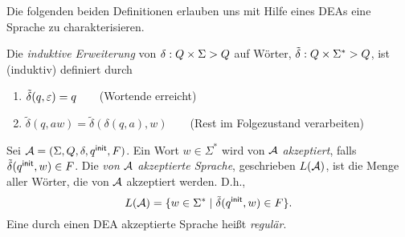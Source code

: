 \begin{center}
\end{center}

Die folgenden beiden Definitionen erlauben uns mit Hilfe eines DEAs eine Sprache zu charakterisieren.
\begin{Def}[name={[Induktive erweiterung von $\delta$ auf Wörter]}]\label{def:2.deltaschlange}
        Die \emph{induktive Erweiterung} von $\delta:Q\times\Sigma\->Q$ auf Wörter, $\tilde{\delta}: Q\times\Sigma^*\->Q$, ist (induktiv) definiert durch
  \begin{enumerate}
  \item $\tilde\delta(q,\varepsilon) =q$\ \ \ \  (Wortende erreicht)
  \item $\tilde\delta(q,aw)=\tilde\delta(\delta(q,a),w)$\ \ \ \ (Rest im Folgezustand verarbeiten)
  \qedhere
  \end{enumerate}
\end{Def}
\begin{Def}[name={[Die durch einen \acs*{DEA} akzeptierte Sprache]}]\label{def:2.sprache}
        Sei $\mathcal{A}=(\Sigma, Q,\delta,{q^\mathsf{init}},F)$. 
        Ein Wort $w\in\Sigma^*$ wird von $\mathcal{A}$ \emph{akzeptiert}, falls $\tilde\delta({q^\mathsf{init}},w)\in F$.
        Die \emph{von $\mathcal{A}$ akzeptierte Sprache}, geschrieben $L(\mathcal{A})$, ist die Menge aller Wörter, die von $\mathcal{A}$ akzeptiert werden. D.h., 
        \[ L(\mathcal{A}) = \{ w\in\Sigma^* \mid \tilde\delta({q^\mathsf{init}},w)\in F \}. \]
        Eine durch einen \ac{DEA} akzeptierte Sprache heißt \emph{regulär}.
\end{Def}

